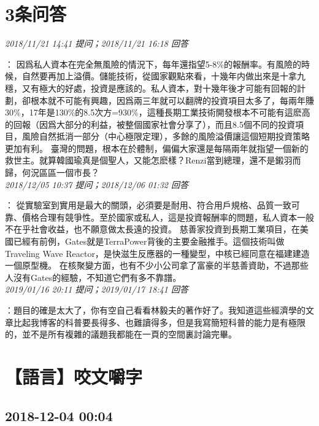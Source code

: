 \documentclass[twocolumn]{ctexart}
\begin{document}
\section{3条问答}

\textit{\hfill\noindent\small 2018/11/21 14:41 提问；2018/11/21 16:18 回答}

：
因爲私人資本在完全無風險的情況下，每年還指望5-8\%的報酬率。有風險的時候，自然要再加上溢價。儲能技術，從國家觀點來看，十幾年内做出來是十拿九穩，又有極大的好處，投資是應該的。私人資本，對十幾年後才可能有回報的計劃，卻根本就不可能有興趣，因爲兩三年就可以翻牌的投資項目太多了，每兩年賺30\%，17年是130\%的8.5次方=930\%，這種長期工業技術開發根本不可能有這麽高的回報（因爲大部分的利益，被整個國家社會分享了），而且8.5個不同的投資項目，風險自然抵消一部分（中心極限定理），多餘的風險溢價讓這個短期投資策略更加有利。
臺灣的問題，根本在於體制，偏偏大家還是每隔兩年就指望一個新的救世主。就算韓國瑜真是個聖人，又能怎麽樣？Renzi當到總理，還不是鎩羽而歸，何況區區一個市長？
\\

\textit{\hfill\noindent\small 2018/12/05 10:37 提问；2018/12/06 01:32 回答}

：
從實驗室到實用是最大的關頭，必須要是耐用、符合用戶規格、品質一致可靠、價格合理有競爭性。至於國家或私人，這是投資報酬率的問題，私人資本一般不在乎社會收益，也不願意做太長遠的投資。
慈善家投資到長期工業項目，在美國已經有前例，Gates就是TerraPower背後的主要金融推手。這個技術叫做Traveling Wave Reactor，是快滋生反應器的一種變型，中核已經同意在福建建造一個原型機。
在核聚變方面，也有不少小公司拿了富豪的半慈善資助，不過那些人沒有Gates的經驗，不知道它們有多不靠譜。
\\

\textit{\hfill\noindent\small 2019/01/16 20:11 提问；2019/01/17 18:41 回答}

：題目的確是太大了，你有空自己看看林毅夫的著作好了。我知道這些經濟學的文章比起我博客的科普要長得多、也難讀得多，但是我寫簡短科普的能力是有極限的，並不是所有複雜的議題我都能在一頁的空間裏討論完畢。
\\


\section{【語言】咬文嚼字}
\subsection{2018-12-04 00:04}
\end{document}
